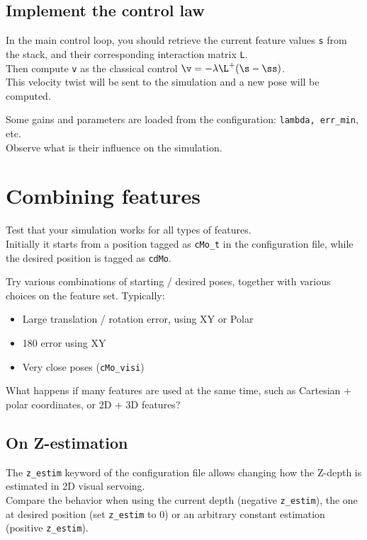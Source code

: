 \documentclass{ecnreport}
\begin{document}
\subsection{Implement the control law}

In the main control loop, you should retrieve the current feature values \texttt{s} from the stack, and their corresponding interaction matrix \texttt{L}.\\
Then compute \texttt{v} as the classical control $\v = -\lambda\L^+(\s-\ss)$.\\

This velocity twist will be sent to the simulation and a new pose will be computed.

Some gains and parameters are loaded from the configuration: \texttt{lambda, err\_min}, etc.\\
Observe what is their influence on the simulation.

\section{Combining features}

Test that your simulation works for all types of features. \\

Initially it starts from a position tagged as \texttt{cMo\_t} in the configuration file, while the desired position is tagged as \texttt{cdMo}.

Try various combinations of starting / desired poses, together with various choices on the feature set. Typically:
\begin{itemize}
 \item Large translation / rotation error, using XY or Polar
 \item 180 error using XY
 \item Very close poses (\texttt{cMo\_visi})
\end{itemize}


What happens if many features are used at the same time, such as Cartesian + polar coordinates, or 2D + 3D features?

\subsection{On Z-estimation}

The \texttt{z\_estim} keyword of the configuration file allows changing how the Z-depth is estimated in 2D visual servoing.\\
Compare the behavior when using the current depth (negative \texttt{z\_estim}), the one at desired position (set \texttt{z\_estim} to 0) or an arbitrary constant estimation (positive \texttt{z\_estim}).
\end{document}
